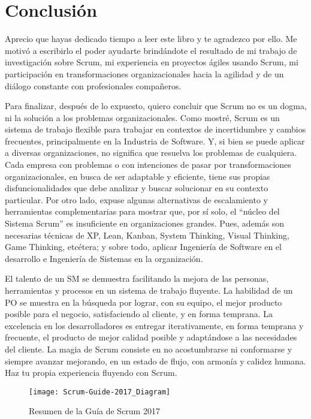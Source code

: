 \chapter{Conclusión}

Aprecio que hayas dedicado tiempo a leer este libro y te agradezco por ello. Me motivó a escribirlo el poder ayudarte brindándote el resultado de mi trabajo de investigación sobre Scrum, mi experiencia en proyectos ágiles usando Scrum, mi participación en transformaciones organizacionales hacia la agilidad y de un diálogo constante con profesionales compañeros. 

Para finalizar, después de lo expuesto, quiero concluir que Scrum no es un dogma, ni la solución a los problemas organizacionales. Como mostré, Scrum es un sistema de trabajo flexible para trabajar en contextos de incertidumbre y cambios frecuentes, principalmente en la Industria de Software. Y, si bien se puede aplicar a diversas organizaciones, no significa que resuelva los problemas de cualquiera. Cada empresa con problemas o con intenciones de pasar por transformaciones organizacionales, en busca de ser adaptable y eficiente, tiene sus propias disfuncionalidades que debe analizar y buscar solucionar en su contexto particular. Por otro lado, expuse algunas alternativas de escalamiento y herramientas complementarias para mostrar que, por sí solo, el “núcleo del Sistema Scrum” es insuficiente en organizaciones grandes. Pues, además son necesarias técnicas de XP, Lean, Kanban, System Thinking, Visual Thinking, Game Thinking, etcétera; y sobre todo, aplicar Ingeniería de Software en el desarrollo e Ingeniería de Sistemas en la organización.

El talento de un SM se demuestra facilitando la mejora de las personas, herramientas y procesos en un sistema de trabajo fluyente. La habilidad de un PO se muestra en la búsqueda por lograr, con su equipo, el mejor producto posible para el negocio, satisfaciendo al cliente, y en forma temprana. La excelencia en los desarrolladores es entregar iterativamente, en forma temprana y frecuente, el producto de mejor calidad posible y adaptándose a las necesidades del cliente. La magia de Scrum consiste en no acostumbrarse ni conformarse y siempre avanzar mejorando, en un estado de flujo, con armonía y calidez humana. Haz tu propia experiencia fluyendo con Scrum.

\begin{figure}[h]
  \centering
  \texttt{[image: Scrum-Guide-2017\_Diagram]}
  \caption{Resumen de la Guía de Scrum 2017}
  \centering
  \label{fig:EmblemaAgil} %
\end{figure}
